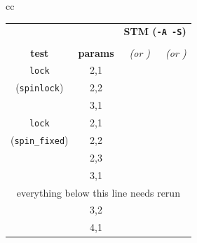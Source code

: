 \begin{table}[t]
	\begin{center}
		\footnotesize
		\begin{tabular}{cc}
		\begin{tabular}{cc||r|r}
			& & \multicolumn{2}{c}{\bf STM ({\tt -A -S})} \\
			& & \cpu{\bf cpu (s)} & \ints{\bf SS size} \\
			\bf test & \bf params & \em (or \ETAdag{\bf \em est.}) & \em (or \ETAdag{\bf \em est.}) \\
			\hline
			\hline
			{\tt lock}
			& 2,1 & \cpu{3.19} & \ints{4} \\
			({\tt spinlock})
			& 2,2 & \cpu{184.51} & \ints{1702} \\
			& 3,1 & \cpu{33.29} & \ints{246} \\
			\hline
			{\tt lock}
			& 2,1 & \cpu{qqq} & \ints{4} \\
			({\tt spin\_fixed})
			& 2,2 & \cpu{104.77} & \ints{998} \\
			& 2,3 & \ETAdag{qqq} & \ETAdag{qqq} \\
			& 3,1 & \cpu{26.96} & \ints{186} \\
			\hline \multicolumn{4}{c}{everything below this line needs rerun} \\
			& 3,2 & \ETAdag{8y 153d} & \ETAdag{1590416} \\ %
			& 4,1 & \cpu{30408.58} & \ints {282084} \\ %

\end{tabular}
\end{tabular}
\end{center}
\end{table}
